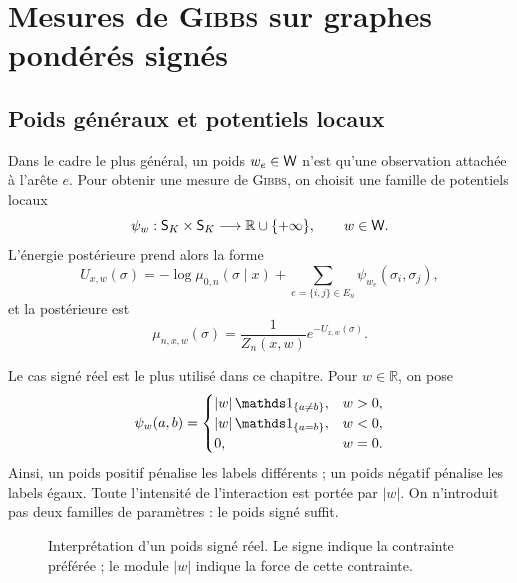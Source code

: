 \section{Mesures de \textsc{Gibbs} sur graphes pondérés signés}
\label{sec:chapII_gibbs_poids}

\subsection{Poids généraux et potentiels locaux}

Dans le cadre le plus général, un poids $w_e\in\mathsf W$ n'est qu'une observation attachée à l'arête $e$. Pour obtenir une mesure de \textsc{Gibbs}, on choisit une famille de potentiels locaux
\[
    \psi_w:\mathsf S_K\times\mathsf S_K\longrightarrow\mathbb R\cup\{+\infty\},
    \qquad w\in\mathsf W.
\]
L'énergie postérieure prend alors la forme
\begin{equation}
    U_{x,w}(\sigma)
    =
    -\log\mu_{0,n}(\sigma\mid x)
    +
    \sum_{e=\{i,j\}\in E_n}\psi_{w_e}(\sigma_i,\sigma_j),
    \label{eq:chapII_energy_general_weights}
\end{equation}
et la postérieure est
\begin{equation}
    \mu_{n,x,w}(\sigma)=\frac1{Z_n(x,w)}e^{-U_{x,w}(\sigma)}.
    \label{eq:chapII_gibbs_general_weights}
\end{equation}

Le cas signé réel est le plus utilisé dans ce chapitre. Pour $w\in\mathbb R$, on pose
\begin{equation}
    \psi_w(a,b)
    =
    \begin{cases}
        |w|\,\ind{a\neq b},& w>0,\\
        |w|\,\ind{a=b},& w<0,\\
        0,& w=0.
    \end{cases}
    \label{eq:chapII_signed_potential}
\end{equation}
Ainsi, un poids positif pénalise les labels différents ; un poids négatif pénalise les labels égaux. Toute l'intensité de l'interaction est portée par $|w|$. On n'introduit pas deux familles de paramètres : le poids signé suffit.

\begin{figure}[H]
\centering
{}
\caption{Interprétation d'un poids signé réel. Le signe indique la contrainte préférée ; le module $|w|$ indique la force de cette contrainte.}
\label{fig:chapII_signed_weight}
\end{figure}

